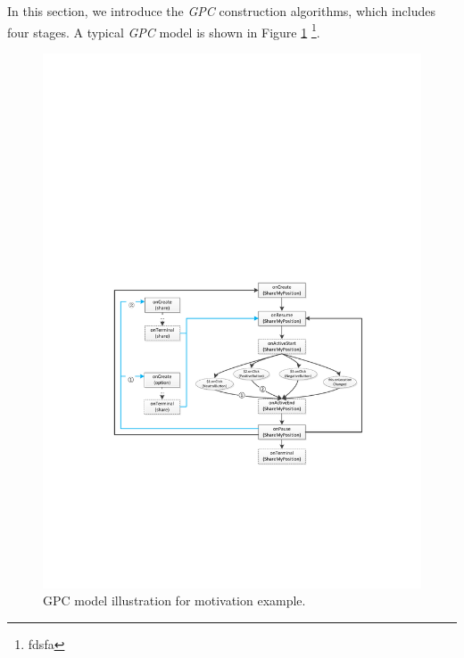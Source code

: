 In this section, we introduce the \textit{GPC} construction algorithms, %
which includes four stages. A typical \textit{GPC} model is shown in Figure \ref{fig:motivationGPC} \footnote{fdsfa}. 
\begin{figure}[htbp]  
  \centering  
  \includegraphics[width=1\linewidth]{pic/motivationGPM.pdf}  
  \caption{GPC model illustration for motivation example.}  
  \label{fig:motivationGPC}  
\end{figure}
